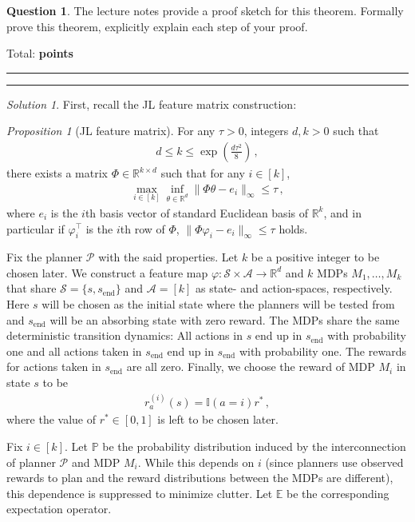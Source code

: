 \documentclass{article}
\DeclareMathOperator*{\1}{\mathbbm{1}}
\newcommand{\0}{\mathbf{0}}
\newcounter{DocPoints} %
\newcounter{QuestionPoints} %
\newcommand{\tpoints}[1]{        %
	\ifthenelse{\isempty{#1}}%
	{%
	}%
	{%
		\addtocounter{DocPoints}{#1}
		\addtocounter{QuestionPoints}{#1}
	}													 %
	\par\mbox{}\par\noindent\hfill {Total: \bf \arabic{QuestionPoints}\xspace points}\par\mbox{}\par\hrule\hrule
	\setcounter{QuestionPoints}{0}
}
\theoremstyle{definition}
\newtheorem{question}{Question}
\theoremstyle{remark}
\newtheorem*{solution*}{Solution}
\theoremstyle{theorem}
\newtheorem{proposition}{Proposition}
\begin{document}
\begin{question}
  The lecture notes provide a proof sketch for this theorem. Formally prove this theorem, explicitly explain each step of your proof. 
\tpoints{20}
\end{question}
\begin{solution*}
First, recall the JL feature matrix construction:
\begin{proposition}[JL feature matrix]
For any $\tau>0$, integers $d,k>0$  such that
\begin{align}
d\le k \le \exp\left(\frac{d\tau^2}{8}\right)\,,
\label{eq:krange}
\end{align}
there exists a matrix $\Phi \in \mathbb{R}^{k\times d}$ such that
for any $i\in[k]$,
\begin{align}
\max_{i\in [k]} \inf_{\theta\in \mathbb{R}^d} \|\Phi \theta - e_i \|_\infty \le \tau\,,
\label{eq:featjl}
\end{align}
where
$e_i$ is the $i$th basis vector of standard Euclidean basis of $\mathbb{R}^k$,
and in particular if $\varphi_i^\top$ is the $i$th row of $\Phi$,
$\|\Phi \varphi_i - e_i\|_\infty \le \tau$
holds.
\end{proposition}


\newcommand{\send}{s_{\text{end}}}
Fix the planner $\mathcal{P}$ with the said properties.
Let $k$ be a positive integer to be chosen later.
We construct a feature map $\varphi:\mathcal{S}\times \mathcal{A}\to \mathbb{R}^d$
and $k$ MDPs $M_1,\dots,M_k$
that share $\mathcal{S}=\{s,\send\}$ and $\mathcal{A}=[k]$ as state- and action-spaces, respectively.
Here $s$ will be chosen as the initial state where the planners will be tested from and
 $\send$ will be an absorbing state with zero reward. 
The MDPs share the same deterministic transition dynamics: 
All actions in $s$ end up in $\send$ with probability one 
and all actions taken in $\send$ end up in $\send$ with probability one.
The rewards for actions taken in $\send$ are all zero.
Finally, we choose the reward of MDP $M_i$ in state $s$
to be 
\begin{align*}
r_a^{(i)}(s)=\mathbb{I}(a=i) r^*\,,
\end{align*}
where the value of $r^*\in [0,1]$ is left to be chosen later. 

Fix $i\in [k]$. Let $\mathbb{P}$ be the probability distribution induced by the interconnection of planner $\mathcal{P}$ and MDP $M_i$. While this depends on $i$ (since planners use observed rewards to plan and the reward distributions between the MDPs are different), this dependence is suppressed to minimize clutter.
Let $\mathbb{E}$ be the corresponding expectation operator.


\end{solution*}
\end{document}
